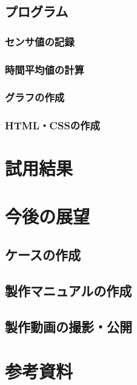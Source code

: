 \documentclass[a4paper]{jsarticle}
\begin{document}
\subsection{プログラム}
\subsubsection{センサ値の記録}
\subsubsection{時間平均値の計算}
\subsubsection{グラフの作成}
\subsubsection{HTML・CSSの作成}
\section{試用結果}
\section{今後の展望}
\subsection{ケースの作成}
\subsection{製作マニュアルの作成}
\subsection{製作動画の撮影・公開}
\section{参考資料}
\end{document}
